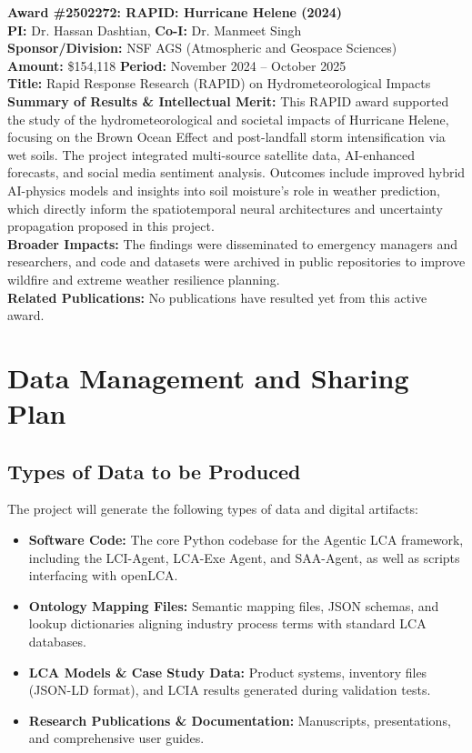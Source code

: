 \documentclass[11pt]{article}
\begin{document}
\vspace{0.3cm}
\noindent \textbf{Award \#2502272: RAPID: Hurricane Helene (2024)} \\
\textbf{PI:} Dr. Hassan Dashtian, \textbf{Co-I:} Dr. Manmeet Singh \\
\textbf{Sponsor/Division:} NSF AGS (Atmospheric and Geospace Sciences) \\
\textbf{Amount:} \$154,118 \quad \textbf{Period:} November 2024 -- October 2025 \\
\textbf{Title:} Rapid Response Research (RAPID) on Hydrometeorological Impacts \\
\textbf{Summary of Results \& Intellectual Merit:} This RAPID award supported the study of the hydrometeorological and societal impacts of Hurricane Helene, focusing on the Brown Ocean Effect and post-landfall storm intensification via wet soils. The project integrated multi-source satellite data, AI-enhanced forecasts, and social media sentiment analysis. Outcomes include improved hybrid AI-physics models and insights into soil moisture's role in weather prediction, which directly inform the spatiotemporal neural architectures and uncertainty propagation proposed in this project. \\
\textbf{Broader Impacts:} The findings were disseminated to emergency managers and researchers, and code and datasets were archived in public repositories to improve wildfire and extreme weather resilience planning. \\
\textbf{Related Publications:} No publications have resulted yet from this active award.


\newpage
\section{Data Management and Sharing Plan}
\subsection{Types of Data to be Produced}
The project will generate the following types of data and digital artifacts:
\begin{itemize}
    \item \textbf{Software Code:} The core Python codebase for the Agentic LCA framework, including the LCI-Agent, LCA-Exe Agent, and SAA-Agent, as well as scripts interfacing with openLCA.
    \item \textbf{Ontology Mapping Files:} Semantic mapping files, JSON schemas, and lookup dictionaries aligning industry process terms with standard LCA databases.
    \item \textbf{LCA Models \& Case Study Data:} Product systems, inventory files (JSON-LD format), and LCIA results generated during validation tests.
    \item \textbf{Research Publications \& Documentation:} Manuscripts, presentations, and comprehensive user guides.
\end{itemize}
\end{document}

